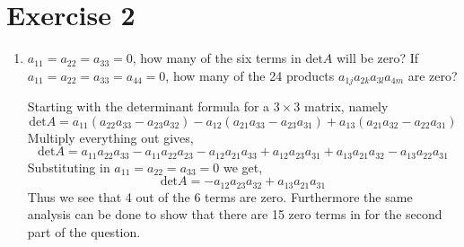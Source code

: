 \section{Exercise 2}
\begin{enumerate}[label=\arabic*.]
    \item $a_{11} = a_{22} = a_{33} =0 $, how many of the six terms in
        $\text{det} A$ will be zero? If $a_{11} = a_{22} = a_{33} = a_{44}
        = 0 $, how many of the 24 products $a_{1j}a_{2k}a_{3l}a_{4m}$ are
        zero?
        \begin{mdframed}[style=MyFrame]
            Starting with the determinant formula for a $3 \times 3$
            matrix, namely
            \begin{equation}
                \text{det}A =
                    a_{11}(a_{22}a_{33} - a_{23}a_{32})
                    -a_{12}(a_{21} a_{33} - a_{23}a_{31})
                    + a_{13}(a_{21}a_{32} -a_{22}a_{31})
            \end{equation}
            Multiply everything out gives,
            \begin{equation}
                \text{det}A = 
                    a_{11}a_{22}a_{33} 
                    -a_{11}a_{22}a_{23}  
                    -a_{12}a_{21}a_{33}  
                    +a_{12}a_{23}a_{31}  
                    +a_{13}a_{21}a_{32}  
                    -a_{13}a_{22}a_{31}  
            \end{equation}
            Substituting in $a_{11} = a_{22} = a_{33} =0 $ we get,
            \begin{equation}
                \text{det}A = 
                    -a_{12}a_{23}a_{32} + a_{13}a_{21}a_{31}
            \end{equation}
            Thus we see that 4 out of the 6 terms are zero. Furthermore the
            same analysis can be done to show that there are 15 zero terms
            in for the second part of the question. 
        \end{mdframed}
                

\end{enumerate}
